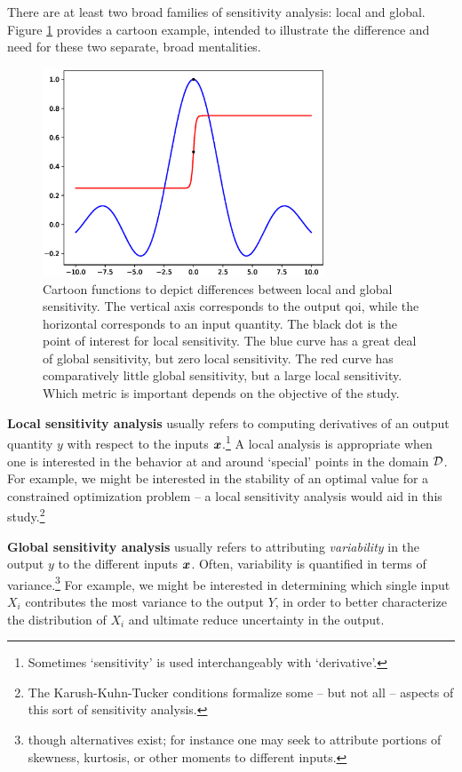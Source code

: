 \documentclass[../primer.tex]{subfiles}
\begin{document}
There are at least two broad families of sensitivity analysis: local and global.
Figure \ref{fig:local-vs-global} provides a cartoon example, intended to
illustrate the difference and need for these two separate, broad mentalities.

\begin{figure}[!ht]
  \centering\includegraphics[width=0.75\textwidth]{./images/local_vs_global}
  \caption{Cartoon functions to depict differences between local and global
    sensitivity. The vertical axis corresponds to the output qoi, while the
    horizontal corresponds to an input quantity. The black dot is the point of
    interest for local sensitivity. The blue curve has a great deal of global
    sensitivity, but zero local sensitivity. The red curve has comparatively
    little global sensitivity, but a large local sensitivity. Which metric is
    important depends on the objective of the study.}
  \label{fig:local-vs-global}
\end{figure}

\textbf{Local sensitivity analysis} usually refers to computing derivatives of
an output quantity $y$ with respect to the inputs $\boldsymbol{x}$.\footnote{Sometimes
  `sensitivity' is used interchangeably with `derivative'.} A local analysis is
appropriate when one is interested in the behavior at and around `special'
points in the domain $\mathcal{D}$. For example, we might be interested in the stability
of an optimal value for a constrained optimization problem -- a local
sensitivity analysis would aid in this study.\footnote{The Karush-Kuhn-Tucker
  conditions formalize some -- but not all -- aspects of this sort of
  sensitivity analysis.\cite{boyd2004convex}}

\textbf{Global sensitivity analysis} usually refers to attributing
\emph{variability} in the output $y$ to the different inputs $\boldsymbol{x}$. Often,
variability is quantified in terms of variance.\footnote{though alternatives
  exist; for instance one may seek to attribute portions of skewness, kurtosis,
  or other moments to different inputs.\cite{owen2014higher}} For example, we
might be interested in determining which single input $X_i$ contributes the most
variance to the output $Y$, in order to better characterize the distribution of
$X_i$ and ultimate reduce uncertainty in the output.
\end{document}
